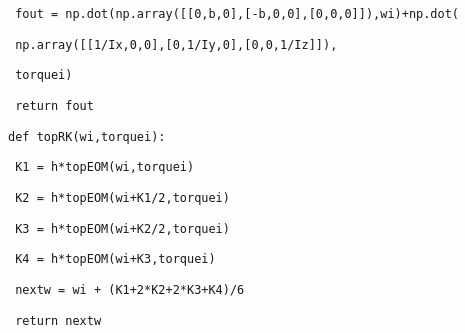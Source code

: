 \documentclass[12pt]{article}
\begin{document}
\texttt{\ fout = np.dot(np.array([[0,b,0],[-b,0,0],[0,0,0]]),wi)+np.dot(}

\texttt{\ np.array([[1/Ix,0,0],[0,1/Iy,0],[0,0,1/Iz]]),}

\texttt{\ torquei)}

\texttt{\ return fout}

\texttt{def topRK(wi,torquei):}

\texttt{\ K1 = h*topEOM(wi,torquei)}

\texttt{\ K2 = h*topEOM(wi+K1/2,torquei)}

\texttt{\ K3 = h*topEOM(wi+K2/2,torquei)}

\texttt{\ K4 = h*topEOM(wi+K3,torquei)}

\texttt{\ nextw = wi + (K1+2*K2+2*K3+K4)/6}

\texttt{\ return nextw}
\end{document}
